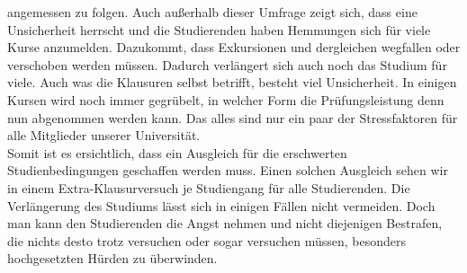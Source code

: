         angemessen zu folgen. Auch außerhalb dieser Umfrage zeigt sich, dass eine Unsicherheit herrscht
        und die Studierenden haben Hemmungen sich für viele Kurse anzumelden. Dazukommt, dass
        Exkursionen und dergleichen wegfallen oder verschoben werden müssen. Dadurch verlängert sich
        auch noch das Studium für viele. Auch was die Klausuren selbst betrifft, besteht viel Unsicherheit.
        In einigen Kursen wird noch immer gegrübelt, in welcher Form die Prüfungsleistung denn nun
        abgenommen werden kann. Das alles sind nur ein paar der Stressfaktoren für alle Mitglieder unserer
        Universität.\\
        Somit ist es ersichtlich, dass ein Ausgleich für die erschwerten Studienbedingungen geschaffen
        werden muss. Einen solchen Ausgleich sehen wir in einem Extra-Klausurversuch je Studiengang für
        alle Studierenden. Die Verlängerung des Studiums lässt sich in einigen Fällen nicht vermeiden.
        Doch man kann den Studierenden die Angst nehmen und nicht diejenigen Bestrafen, die nichts
        desto trotz versuchen oder sogar versuchen müssen, besonders hochgesetzten Hürden zu
        überwinden.
    \ul{}

